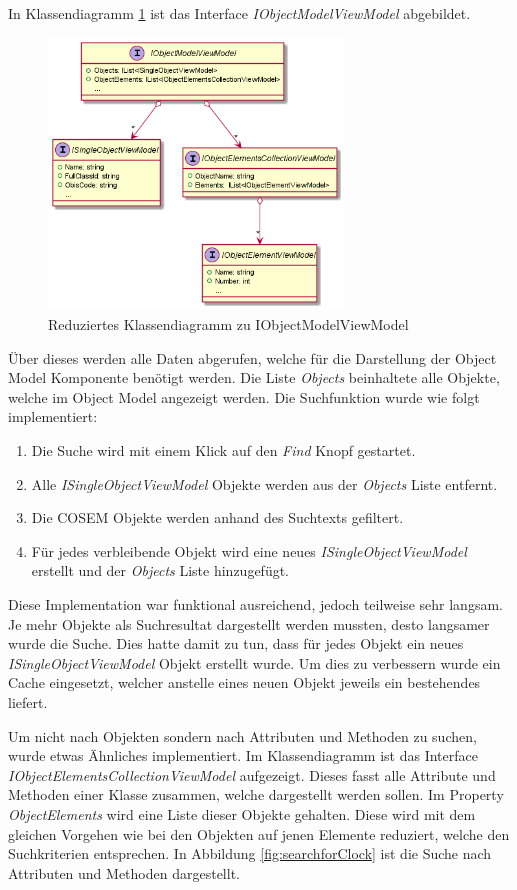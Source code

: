 In Klassendiagramm \ref{fig:objectModelVMClassDiagram} ist das Interface \textit{IObjectModelViewModel} abgebildet.
\begin{figure}
   \centering
   \includegraphics[width=0.7\textwidth]{gfx/OMVM.png}
   \caption{
      Reduziertes Klassendiagramm zu IObjectModelViewModel
      }
      \label{fig:objectModelVMClassDiagram}
\end{figure}
Über dieses werden alle Daten abgerufen, welche für die Darstellung der Object Model Komponente benötigt werden.
Die Liste \textit{Objects} beinhaltete alle Objekte, welche im Object Model angezeigt werden.
Die Suchfunktion wurde wie folgt implementiert:
\begin{enumerate}
   \item Die Suche wird mit einem Klick auf den \textit{Find} Knopf gestartet.
   \item Alle \textit{ISingleObjectViewModel} Objekte werden aus der \textit{Objects} Liste entfernt.
   \item Die \ac{COSEM} Objekte werden anhand des Suchtexts gefiltert.
   \item Für jedes verbleibende Objekt wird eine neues \textit{ISingleObjectViewModel} erstellt und der \textit{Objects} Liste hinzugefügt.
\end{enumerate} 
Diese Implementation war funktional ausreichend, jedoch teilweise sehr langsam.
Je mehr Objekte als Suchresultat dargestellt werden mussten, desto langsamer wurde die Suche.
Dies hatte damit zu tun, dass für jedes Objekt ein neues \textit{ISingleObjectViewModel} Objekt erstellt wurde.
Um dies zu verbessern wurde ein Cache eingesetzt, welcher anstelle eines neuen Objekt jeweils ein bestehendes liefert.

Um nicht nach Objekten sondern nach Attributen und Methoden zu suchen, wurde etwas Ähnliches implementiert.
Im Klassendiagramm ist das Interface \textit{IObjectElementsCollectionViewModel} aufgezeigt.
Dieses fasst alle Attribute und Methoden einer Klasse zusammen, welche dargestellt werden sollen.
Im Property \textit{ObjectElements} wird eine Liste dieser Objekte gehalten.
Diese wird mit dem gleichen Vorgehen wie bei den Objekten auf jenen Elemente reduziert, welche den Suchkriterien entsprechen.
In Abbildung \ref{fig:searchforClock} ist die Suche nach Attributen und Methoden dargestellt.


